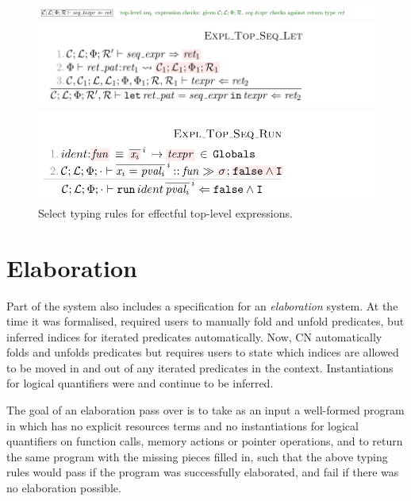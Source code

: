 \begin{figure}[tp]
    \includegraphics{figures/kernel-seq-texpr-typing-1}
    \begin{minipage}{0.7\textwidth}
        \includegraphics{figures/kernel-seq-texpr-typing-2}
    \end{minipage}
    \begin{minipage}{0.7\textwidth}
    \includegraphics{figures/kernel-seq-texpr-typing-3}
    \end{minipage}
    \caption{Select  typing rules for effectful top-level
        expressions.}\label{fig:typing-seq-texpr}
\end{figure}

\section{Elaboration}

Part of the  system also includes a specification for an
\emph{elaboration} system. At the time it was formalised, 
required users to manually fold and unfold predicates, but inferred indices for iterated predicates
automatically. Now, CN automatically folds and unfolds predicates but requires
users to state which indices are allowed to be moved in and out of any iterated
predicates in the context.
Instantiations for logical quantifiers were and continue to be inferred.

The goal of an elaboration pass over  is to take as an input a
well-formed program in  which has no explicit resources terms and
no instantiations for logical quantifiers on function calls, memory actions or
pointer operations, and to return the same program with the missing pieces
filled in, such that the above typing rules would pass if the program was
successfully elaborated, and fail if there was no elaboration possible.

